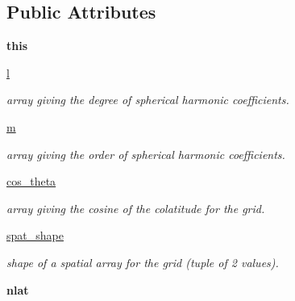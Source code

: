 \subsection*{Public Attributes}
\begin{DoxyCompactItemize}
\item 
\hypertarget{classshtns_1_1sht_ae0bd692d92a71a6c5e692708e761972c}{}{\bfseries this}\label{classshtns_1_1sht_ae0bd692d92a71a6c5e692708e761972c}

\item 
\hyperlink{classshtns_1_1sht_afbfbd4354cf2721b21cc5cac5b7f0cb1}{l}
\begin{DoxyCompactList}\small\item\em array giving the degree of spherical harmonic coefficients. \end{DoxyCompactList}\item 
\hyperlink{classshtns_1_1sht_a629d4d76e7d9331ff17849dd46d32843}{m}
\begin{DoxyCompactList}\small\item\em array giving the order of spherical harmonic coefficients. \end{DoxyCompactList}\item 
\hyperlink{classshtns_1_1sht_a9bd9ea09ef4c82e3f599af447e772721}{cos\+\_\+theta}
\begin{DoxyCompactList}\small\item\em array giving the cosine of the colatitude for the grid. \end{DoxyCompactList}\item 
\hyperlink{classshtns_1_1sht_a01ca7000347fa6ba02aefd04bb072030}{spat\+\_\+shape}
\begin{DoxyCompactList}\small\item\em shape of a spatial array for the grid (tuple of 2 values). \end{DoxyCompactList}\item 
\hypertarget{classshtns_1_1sht_a2d258c7f3fc172cd161448bd6463baf5}{}{\bfseries nlat}\label{classshtns_1_1sht_a2d258c7f3fc172cd161448bd6463baf5}

\end{DoxyCompactItemize}
